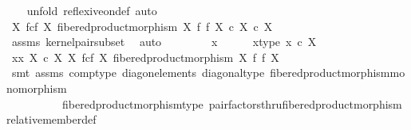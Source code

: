 \begin{isabellebody}
\ \ \isamarkupfalse%
\ {\isacharparenleft}{\kern0pt}unfold\ reflexive{\isacharunderscore}{\kern0pt}on{\isacharunderscore}{\kern0pt}def{\isacharcomma}{\kern0pt}\ auto{\isacharparenright}{\kern0pt}\isanewline
\ \ \ \ \isamarkupfalse%
\ {\isachardoublequoteopen}{\isacharparenleft}{\kern0pt}X\ \isactrlbsub f\isactrlesub {\isasymtimes}\isactrlsub c\isactrlbsub f\isactrlesub \ X{\isacharcomma}{\kern0pt}\ fibered{\isacharunderscore}{\kern0pt}product{\isacharunderscore}{\kern0pt}morphism\ X\ f\ f\ X{\isacharparenright}{\kern0pt}\ {\isasymsubseteq}\isactrlsub c\ X\ {\isasymtimes}\isactrlsub c\ X{\isachardoublequoteclose}\isanewline
\ \ \ \ \ \ \isamarkupfalse%
\ assms\ kernel{\isacharunderscore}{\kern0pt}pair{\isacharunderscore}{\kern0pt}subset\ \isamarkupfalse%
\ auto\isanewline
\ \ \isamarkupfalse%
\isanewline
\ \ \ \ \isamarkupfalse%
\ x\isanewline
\ \ \ \ \isamarkupfalse%
\ x{\isacharunderscore}{\kern0pt}type{\isacharcolon}{\kern0pt}\ {\isachardoublequoteopen}x\ {\isasymin}\isactrlsub c\ X{\isachardoublequoteclose}\isanewline
\ \ \ \ \isamarkupfalse%
\ \isamarkupfalse%
\ {\isachardoublequoteopen}{\isasymlangle}x{\isacharcomma}{\kern0pt}x{\isasymrangle}\ {\isasymin}\isactrlbsub X\ {\isasymtimes}\isactrlsub c\ X\isactrlesub \ {\isacharparenleft}{\kern0pt}X\ \isactrlbsub f\isactrlesub {\isasymtimes}\isactrlsub c\isactrlbsub f\isactrlesub \ X{\isacharcomma}{\kern0pt}\ fibered{\isacharunderscore}{\kern0pt}product{\isacharunderscore}{\kern0pt}morphism\ X\ f\ f\ X{\isacharparenright}{\kern0pt}{\isachardoublequoteclose}\isanewline
\ \ \ \ \ \ \isamarkupfalse%
\ {\isacharparenleft}{\kern0pt}smt\ assms\ comp{\isacharunderscore}{\kern0pt}type\ diag{\isacharunderscore}{\kern0pt}on{\isacharunderscore}{\kern0pt}elements\ diagonal{\isacharunderscore}{\kern0pt}type\ fibered{\isacharunderscore}{\kern0pt}product{\isacharunderscore}{\kern0pt}morphism{\isacharunderscore}{\kern0pt}monomorphism\isanewline
\ \ \ \ \ \ \ \ \ \ fibered{\isacharunderscore}{\kern0pt}product{\isacharunderscore}{\kern0pt}morphism{\isacharunderscore}{\kern0pt}type\ pair{\isacharunderscore}{\kern0pt}factorsthru{\isacharunderscore}{\kern0pt}fibered{\isacharunderscore}{\kern0pt}product{\isacharunderscore}{\kern0pt}morphism\ relative{\isacharunderscore}{\kern0pt}member{\isacharunderscore}{\kern0pt}def{}{\isacharparenright}{\kern0pt}\isanewline
\ \ \isamarkupfalse%
\isanewline
\isanewline
\ \ \isamarkupfalse%

\end{isabellebody}
